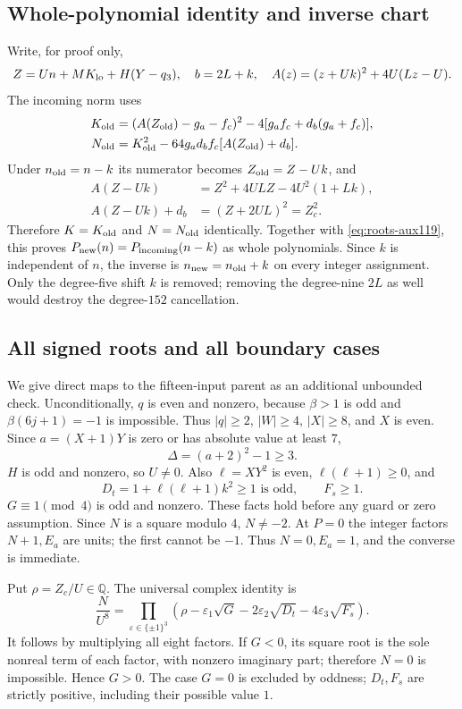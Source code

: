 \subsection{Whole-polynomial identity and inverse chart}
Write, for proof only,
\[
 Z=Un+MK_{\rm lo}+H(Y-q_3),\quad b=2L+k,\quad
 A(z)=(z+Uk)^2+4U(Lz-U).
\]
The incoming norm uses
\begin{align*}
 K_{\rm old}&=(A(Z_{\rm old})-g_a-f_c)^2
                 -4[g_af_c+d_b(g_a+f_c)],\\
 N_{\rm old}&=K_{\rm old}^2
                 -64g_ad_bf_c[A(Z_{\rm old})+d_b].
\end{align*}
Under $n_{\rm old}=n-k$ its numerator becomes $Z_{\rm old}=Z-Uk$, and
\begin{align}
 A(Z-Uk)&=Z^2+4ULZ-4U^2(1+Lk),\label{eq:roots-cut119}\\
 A(Z-Uk)+d_b&=(Z+2UL)^2=Z_c^2.\label{eq:roots-square119}
\end{align}
Therefore $K=K_{\rm old}$ and $N=N_{\rm old}$ identically. Together with
\eqref{eq:roots-aux119}, this proves
$P_{\rm new}(n)=P_{\rm incoming}(n-k)$ as whole polynomials. Since $k$
is independent of $n$, the inverse is $n_{\rm new}=n_{\rm old}+k$ on every
integer assignment. Only the degree-five shift $k$ is removed; removing the
degree-nine $2L$ as well would destroy the degree-$152$ cancellation.

\subsection{All signed roots and all boundary cases}
We give direct maps to the fifteen-input parent as an additional unbounded
check. Unconditionally, $q$ is even and nonzero, because $\beta>1$ is odd and
$\beta(6j+1)=-1$ is impossible. Thus $|q|\ge2$, $|W|\ge4$, $|X|\ge8$,
and $X$ is even. Since $a=(X+1)Y$ is zero or has absolute value at least $7$,
\[
 \Delta=(a+2)^2-1\ge3.
\]
$H$ is odd and nonzero, so $U\ne0$. Also $\ell=XY^2$ is even,
$\ell(\ell+1)\ge0$, and
\[
 D_t=1+\ell(\ell+1)k^2\ge1\text{ is odd},\qquad F_s\ge1.
\]
$G\equiv1\pmod4$ is odd and nonzero. These facts hold before any guard or
zero assumption. Since $N$ is a square modulo $4$, $N\ne-2$. At $P=0$ the
integer factors $N+1,E_a$ are units; the first cannot be $-1$. Thus
$N=0,E_a=1$, and the converse is immediate.

Put $\rho=Z_c/U\in\mathbb Q$. The universal complex identity is
\begin{equation}\label{eq:roots-factors119}
 \frac{N}{U^8}=
 \prod_{\varepsilon\in\{\pm1\}^3}
 (\rho-\varepsilon_1\sqrt G-2\varepsilon_2\sqrt{D_t}
                           -4\varepsilon_3\sqrt{F_s}).
\end{equation}
It follows by multiplying all eight factors. If $G<0$, its square root
is the sole nonreal term of each factor, with nonzero imaginary part; therefore
$N=0$ is impossible. Hence $G>0$. The case $G=0$ is excluded by oddness;
$D_t,F_s$ are strictly positive, including their possible value $1$.

